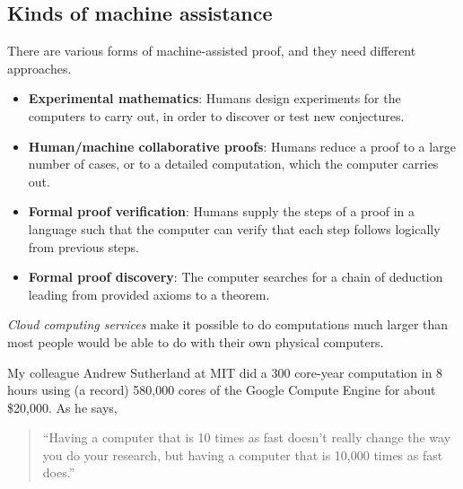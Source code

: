 \def\green#1{{\bf #1}}
\def\magenta#1{{\it #1}}
\subsection {Kinds of machine assistance}
There are various forms of machine-assisted proof, and they need different approaches.
\begin{itemize}
\item \green{Experimental mathematics}: Humans design experiments for the computers
to carry out, in order to discover or test new conjectures.
\item \green{Human/machine collaborative proofs}: Humans reduce a proof to a large 
number of cases, or to a detailed computation, which the computer carries out.
\item \green{Formal proof verification}: Humans supply the steps of a proof
in a language such that the computer can verify that each step 
follows logically from previous steps.
\item \green{Formal proof discovery}: The computer searches for a chain
of deduction leading from provided axioms to a theorem.
\end{itemize}
\magenta{Cloud computing services} make it possible to do computations 
much larger than most people would be able to do with their 
own physical computers.

\begin{example}
My colleague Andrew Sutherland at MIT 
did a 300 core-year computation in 8 hours
using (a record) 580,000 cores of the Google Compute Engine 
for about \$20,000.
\rm 
As he says, 
\begin{quote}
``Having a computer that is 10 times as fast 
doesn't really change the way you do your research, but having a computer
that is 10,000 times as fast does.''
\end{quote}
\end{example}

